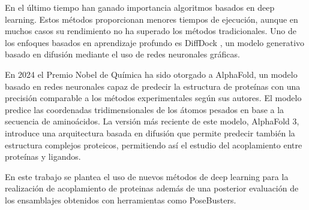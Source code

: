 En el último tiempo han ganado importancia algoritmos basados en deep learning. Estos métodos proporcionan menores
tiempos de ejecución, aunque en muchos casos su rendimiento no ha superado los métodos tradicionales. Uno de los enfoques
basados en aprendizaje profundo es DiffDock , un modelo generativo basado en difusión mediante el uso de redes neuronales
gráficas.

En 2024 el Premio Nobel de Química ha sido otorgado a AlphaFold, un modelo basado en redes neuronales capaz de predecir
la estructura de proteínas con una precisión comparable a los métodos experimentales según sus autores. El modelo predice
las coordenadas tridimensionales de los átomos pesados en base a la secuencia de aminoácidos. La versión más reciente de
este modelo, AlphaFold 3, introduce una arquitectura basada en difusión que permite predecir también la estructura
complejos proteicos, permitiendo así el estudio del acoplamiento entre proteínas y ligandos.


En este trabajo se plantea el uso de nuevos métodos de deep learning para la realización de acoplamiento de proteinas además
de una posterior evaluación de los ensamblajes obtenidos con herramientas como PoseBusters.
